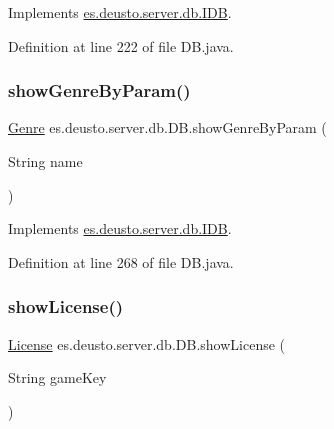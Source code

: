 Implements \hyperlink{interfacees_1_1deusto_1_1server_1_1db_1_1_i_d_b_a9023bdad77781d95fc2e556d1935f763}{es.\+deusto.\+server.\+db.\+I\+DB}.



Definition at line 222 of file D\+B.\+java.

\mbox{\label{classes_1_1deusto_1_1server_1_1db_1_1_d_b_ad3da93de99d7123529260d5dd966f178}} 
\subsubsection{\texorpdfstring{show\+Genre\+By\+Param()}{showGenreByParam()}}
{\footnotesize\ttfamily \hyperlink{classes_1_1deusto_1_1server_1_1db_1_1data_1_1_genre}{Genre} es.\+deusto.\+server.\+db.\+D\+B.\+show\+Genre\+By\+Param (\begin{DoxyParamCaption}\item[{String}]{name }\end{DoxyParamCaption})}



Implements \hyperlink{interfacees_1_1deusto_1_1server_1_1db_1_1_i_d_b_a836faee771a447be79c36d7d4289c614}{es.\+deusto.\+server.\+db.\+I\+DB}.



Definition at line 268 of file D\+B.\+java.

\mbox{\label{classes_1_1deusto_1_1server_1_1db_1_1_d_b_add49bccfecff6217efd34b4656572ed6}} 
\subsubsection{\texorpdfstring{show\+License()}{showLicense()}}
{\footnotesize\ttfamily \hyperlink{classes_1_1deusto_1_1server_1_1db_1_1data_1_1_license}{License} es.\+deusto.\+server.\+db.\+D\+B.\+show\+License (\begin{DoxyParamCaption}\item[{String}]{game\+Key }\end{DoxyParamCaption})}




